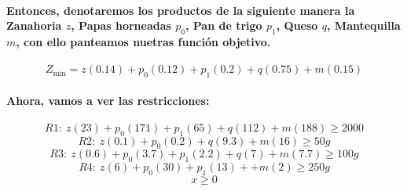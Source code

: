 \documentclass{article}
\begin{document}
\paragraph{Entonces, denotaremos los productos de la siguiente manera la Zanahoria $z$, Papas horneadas $p_{0}$, Pan de trigo $p_{1}$, Queso $q$, Mantequilla $m$, con ello panteamos nuetras función objetivo. }

$$Z_{\min} = z (0.14)+p_{0}(0.12)+p_{1}(0.2)+ q(0.75)+m (0.15)$$

\paragraph{Ahora, vamos a ver las restricciones: }
\begin{flushleft}
$$R1 : \  z (23)+p_{0}(171)+p_{1}(65)+ q(112)+m (188) \geq 2000$$
$$R2 : \  z (0.1)+p_{0}(0.2)+ q(9.3)+m (16) \geq 50g$$
$$R3 : \  z (0.6)+p_{0}(3.7)+p_{1}(2.2)+ q(7)+m (7.7) \geq 100g$$
$$R4 : \  z (6)+p_{0}(30)+p_{1}(13)+ +m (2) \geq 250 g$$
$$x \geq 0$$
\end{flushleft}
\end{document}
